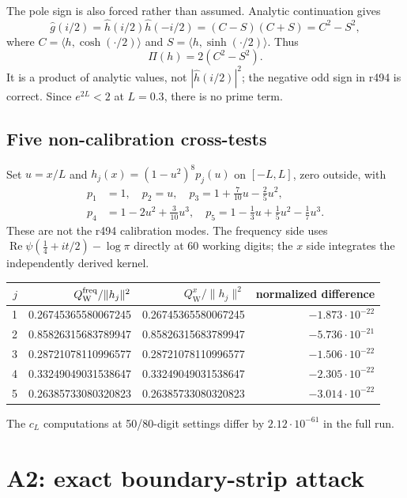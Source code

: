 \documentclass[11pt]{article}
\theoremstyle{remark}
\newcommand{\QW}{Q_{\mathrm W}}
\begin{document}
The pole sign is also forced rather than assumed.  Analytic
continuation gives
\[
 \widehat g(i/2)=\widehat h(i/2)\widehat h(-i/2)
 =(C-S)(C+S)=C^2-S^2,
\]
where $C=\langle h,\cosh(\cdot/2)\rangle$ and
$S=\langle h,\sinh(\cdot/2)\rangle$.  Thus
\[
 \Pi(h)=2(C^2-S^2).
\]
It is a product of analytic values, not
$|\widehat h(i/2)|^2$; the negative odd sign in r494 is correct.
Since $e^{2L}<2$ at $L=0.3$, there is no prime term.

\subsection*{Five non-calibration cross-tests}

Set $u=x/L$ and
$h_j(x)=(1-u^2)^8p_j(u)$ on $[-L,L]$, zero outside, with
\[
\begin{split}
p_1&=1,\quad p_2=u,\quad
p_3=1+\tfrac7{10}u-\tfrac25u^2,\\
p_4&=1-2u^2+\tfrac3{10}u^3,\quad
p_5=1-\tfrac13u+\tfrac15u^2-\tfrac17u^3.
\end{split}
\]
These are not the r494 calibration modes.  The frequency side uses
$\operatorname{Re}\psi(\tfrac14+it/2)-\log\pi$ directly at 60 working
digits; the $x$ side integrates the independently derived kernel.

\begin{center}
\small
\begin{tabular}{@{}rrrr@{}}
\toprule
$j$ & $\QW^{\rm freq}/\|h_j\|^2$
& $\QW^{x}/\|h_j\|^2$ & normalized difference\\
\midrule
1&0.26745365580067245&0.26745365580067245&$-1.873\cdot10^{-22}$\\
2&0.85826315683789947&0.85826315683789947&$-5.736\cdot10^{-21}$\\
3&0.28721078110996577&0.28721078110996577&$-1.506\cdot10^{-22}$\\
4&0.33249049031538647&0.33249049031538647&$-2.305\cdot10^{-22}$\\
5&0.26385733080320823&0.26385733080320823&$-3.014\cdot10^{-22}$\\
\bottomrule
\end{tabular}
\end{center}
The $c_L$ computations at 50/80-digit settings differ by
$2.12\cdot10^{-61}$ in the full run.

\section{A2: exact boundary-strip attack}
\end{document}
